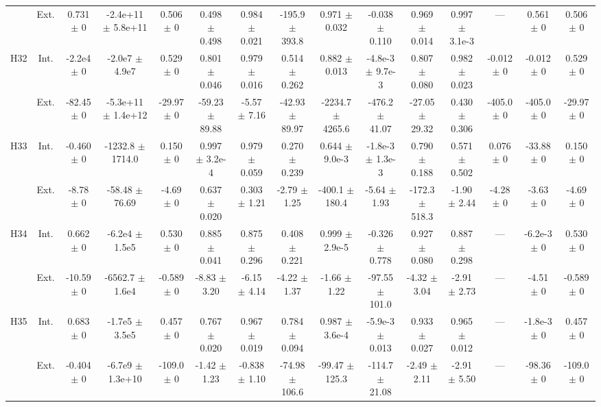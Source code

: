 \begin{table}[htbp]
{\begin{tabular}{@{}ccccccccccccccc@{}}
 & Ext. & 0.731 $\pm$ 0 & -2.4e+11 $\pm$ 5.8e+11 & 0.506 $\pm$ 0 & 0.498 $\pm$ 0.498 & 0.984 $\pm$ 0.021 & -195.9 $\pm$ 393.8 & 0.971 $\pm$ 0.032 & -0.038 $\pm$ 0.110 & 0.969 $\pm$ 0.014 & 0.997 $\pm$ 3.1e-3 & --- & 0.561 $\pm$ 0 & 0.506 $\pm$ 0 \\
\cline{2-15}
\multirow{2}{*}{H32} & Int. & -2.2e4 $\pm$ 0 & -2.0e7 $\pm$ 4.9e7 & 0.529 $\pm$ 0 & 0.801 $\pm$ 0.046 & 0.979 $\pm$ 0.016 & 0.514 $\pm$ 0.262 & 0.882 $\pm$ 0.013 & -4.8e-3 $\pm$ 9.7e-3 & 0.807 $\pm$ 0.080 & 0.982 $\pm$ 0.023 & -0.012 $\pm$ 0 & -0.012 $\pm$ 0 & 0.529 $\pm$ 0 \\
 & Ext. & -82.45 $\pm$ 0 & -5.3e+11 $\pm$ 1.4e+12 & -29.97 $\pm$ 0 & -59.23 $\pm$ 89.88 & -5.57 $\pm$ 7.16 & -42.93 $\pm$ 89.97 & -2234.7 $\pm$ 4265.6 & -476.2 $\pm$ 41.07 & -27.05 $\pm$ 29.32 & 0.430 $\pm$ 0.306 & -405.0 $\pm$ 0 & -405.0 $\pm$ 0 & -29.97 $\pm$ 0 \\
\cline{2-15}
\multirow{2}{*}{H33} & Int. & -0.460 $\pm$ 0 & -1232.8 $\pm$ 1714.0 & 0.150 $\pm$ 0 & 0.997 $\pm$ 3.2e-4 & 0.979 $\pm$ 0.059 & 0.270 $\pm$ 0.239 & 0.644 $\pm$ 9.0e-3 & -1.8e-3 $\pm$ 1.3e-3 & 0.790 $\pm$ 0.188 & 0.571 $\pm$ 0.502 & 0.076 $\pm$ 0 & -33.88 $\pm$ 0 & 0.150 $\pm$ 0 \\
 & Ext. & -8.78 $\pm$ 0 & -58.48 $\pm$ 76.69 & -4.69 $\pm$ 0 & 0.637 $\pm$ 0.020 & 0.303 $\pm$ 1.21 & -2.79 $\pm$ 1.25 & -400.1 $\pm$ 180.4 & -5.64 $\pm$ 1.93 & -172.3 $\pm$ 518.3 & -1.90 $\pm$ 2.44 & -4.28 $\pm$ 0 & -3.63 $\pm$ 0 & -4.69 $\pm$ 0 \\
\cline{2-15}
\multirow{2}{*}{H34} & Int. & 0.662 $\pm$ 0 & -6.2e4 $\pm$ 1.5e5 & 0.530 $\pm$ 0 & 0.885 $\pm$ 0.041 & 0.875 $\pm$ 0.296 & 0.408 $\pm$ 0.221 & 0.999 $\pm$ 2.9e-5 & -0.326 $\pm$ 0.778 & 0.927 $\pm$ 0.080 & 0.887 $\pm$ 0.298 & --- & -6.2e-3 $\pm$ 0 & 0.530 $\pm$ 0 \\
 & Ext. & -10.59 $\pm$ 0 & -6562.7 $\pm$ 1.6e4 & -0.589 $\pm$ 0 & -8.83 $\pm$ 3.20 & -6.15 $\pm$ 4.14 & -4.22 $\pm$ 1.37 & -1.66 $\pm$ 1.22 & -97.55 $\pm$ 101.0 & -4.32 $\pm$ 3.04 & -2.91 $\pm$ 2.73 & --- & -4.51 $\pm$ 0 & -0.589 $\pm$ 0 \\
\cline{2-15}
\multirow{2}{*}{H35} & Int. & 0.683 $\pm$ 0 & -1.7e5 $\pm$ 3.5e5 & 0.457 $\pm$ 0 & 0.767 $\pm$ 0.020 & 0.967 $\pm$ 0.019 & 0.784 $\pm$ 0.094 & 0.987 $\pm$ 3.6e-4 & -5.9e-3 $\pm$ 0.013 & 0.933 $\pm$ 0.027 & 0.965 $\pm$ 0.012 & --- & -1.8e-3 $\pm$ 0 & 0.457 $\pm$ 0 \\
 & Ext. & -0.404 $\pm$ 0 & -6.7e9 $\pm$ 1.3e+10 & -109.0 $\pm$ 0 & -1.42 $\pm$ 1.23 & -0.838 $\pm$ 1.10 & -74.98 $\pm$ 106.6 & -99.47 $\pm$ 125.3 & -114.7 $\pm$ 21.08 & -2.49 $\pm$ 2.11 & -2.91 $\pm$ 5.50 & --- & -98.36 $\pm$ 0 & -109.0 $\pm$ 0 \\

\end{tabular}}
\end{table}
